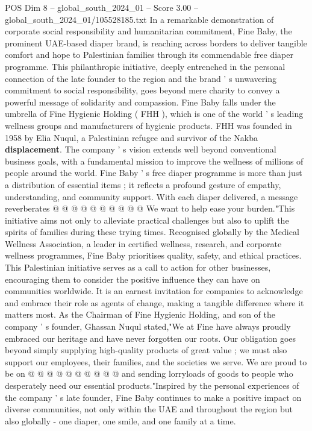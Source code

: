 \begin{textsample}{POS Dim 8 – global\_south\_2024\_01 – Score 3.00 – global\_south\_2024\_01/105528185.txt}  \label{ex:f8_pos_399}
In a remarkable demonstration of corporate social responsibility and humanitarian commitment, Fine Baby, the prominent UAE-based diaper brand, is reaching across borders to deliver tangible comfort and hope to Palestinian families through its commendable free diaper programme.
This philanthropic initiative, deeply entrenched in the personal connection of the late founder to the region and the brand ' s unwavering commitment to social responsibility, goes beyond mere charity to convey a powerful message of solidarity and compassion.
Fine Baby falls under the umbrella of Fine Hygienic Holding ( FHH ), which is one of the world ' s leading wellness groups and manufacturers of hygienic products.
FHH was founded in 1958 by Elia Nuqul, a Palestinian refugee and survivor of the Nakba \textbf{displacement}.
The company ' s vision extends well beyond conventional business goals, with a fundamental mission to improve the wellness of millions of people around the world.
Fine Baby ' s free diaper programme is more than just a distribution of essential items ; it reflects a profound gesture of empathy, understanding, and community support.
With each diaper delivered, a message reverberates @ @ @ @ @ @ @ @ @ @ We want to help ease your burden."This initiative aims not only to alleviate practical challenges but also to uplift the spirits of families during these trying times.
Recognised globally by the Medical Wellness Association, a leader in certified wellness, research, and corporate wellness programmes, Fine Baby prioritises quality, safety, and ethical practices.
This Palestinian initiative serves as a call to action for other businesses, encouraging them to consider the positive influence they can have on communities worldwide.
It is an earnest invitation for companies to acknowledge and embrace their role as agents of change, making a tangible difference where it matters most.
As the Chairman of Fine Hygienic Holding, and son of the company ' s founder, Ghassan Nuqul stated,"We at Fine have always proudly embraced our heritage and have never forgotten our roots.
Our obligation goes beyond simply supplying high-quality products of great value ; we must also support our employees, their families, and the societies we serve.
We are proud to be on @ @ @ @ @ @ @ @ @ @ and sending lorryloads of goods to people who desperately need our essential products."Inspired by the personal experiences of the company ' s late founder, Fine Baby continues to make a positive impact on diverse communities, not only within the UAE and throughout the region but also globally - one diaper, one smile, and one family at a time.

\end{textsample}
